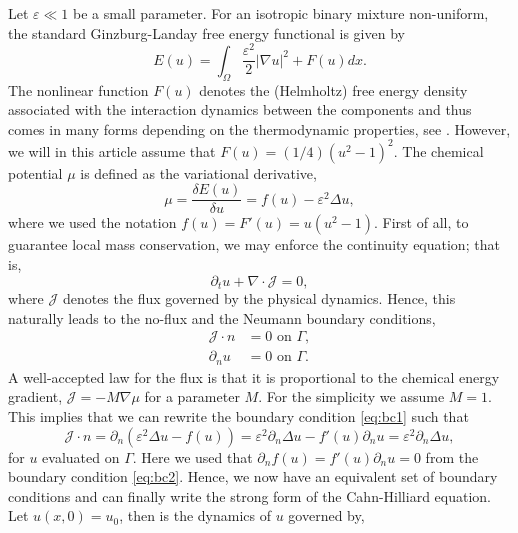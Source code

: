 \documentclass[11pt]{article}
\theoremstyle{remark}
\newcommand{\abs}[1]{\left\lvert #1 \right\rvert}
\numberwithin{equation}{section}
\begin{document}
Let $\varepsilon \ll 1 $ be a small parameter. For an isotropic
binary mixture non-uniform, the standard Ginzburg-Landay free energy functional is given by
\begin{equation}
E( u)  = \int_{\Omega }^{} \frac{\varepsilon^2 }{2} \abs{ \nabla u } ^2 +  F( u) dx.
\end{equation}
The nonlinear function $F( u) $ denotes the (Helmholtz) free energy density associated with the interaction dynamics between the components and thus comes in many forms depending on the thermodynamic properties, see \cite{miranville2017cahn}.
However, we will in this article assume that $F( u) = ( 1 / 4 ) ( u^2 -1 ) ^{2} $.
The chemical potential $\mu $ is defined as the variational derivative,
\begin{equation}
\mu = \frac{ \delta E( u) }{ \delta  u} = f( u)  - \varepsilon^2  \Delta u ,
\end{equation}
where we used the notation $f( u) = F'( u) =u( u^2 -1)  $.
First of all, to guarantee local mass conservation, we may enforce the continuity equation; that is,
\begin{equation}
    \partial _{t} u + \nabla \cdot \mathcal{J}  = 0,
\end{equation}
where $\mathcal{J} $ denotes the flux governed by the physical dynamics. Hence, this naturally leads to the no-flux and the Neumann boundary conditions,
\begin{align}
\label{eq:bc1}
\mathcal{J}  \cdot n & = 0 \text{ on } \Gamma, \\
\label{eq:bc2}
\partial _{n} u & = 0 \text{ on } \Gamma.
\end{align}
 A well-accepted law for the flux is that it is proportional to the chemical energy gradient, $\mathcal{J} = - M  \nabla \mu  $ for a parameter $M$. For the simplicity we assume $M=1$. This implies that we can rewrite the boundary condition
 \eqref{eq:bc1} such that
 \begin{equation}
     \mathcal{J}  \cdot n  = \partial _{n} \left(  \varepsilon^2 \Delta u - f( u)   \right)  = \varepsilon^2  \partial _{n} \Delta u -  f' ( u) \partial _{n}u =  \varepsilon^2  \partial _{n} \Delta u    ,
 \end{equation}
 for $u$ evaluated on $\Gamma $. Here we used that $\partial _{n} f( u) = f' ( u) \partial _{n}u  = 0$ from the boundary condition \eqref{eq:bc2}.
 Hence, we now have an equivalent set of boundary conditions and can finally write the strong form of the Cahn-Hilliard equation. Let $ u( x,0) =  u_{0}$, then is the dynamics of $u$ governed by,
\end{document}
